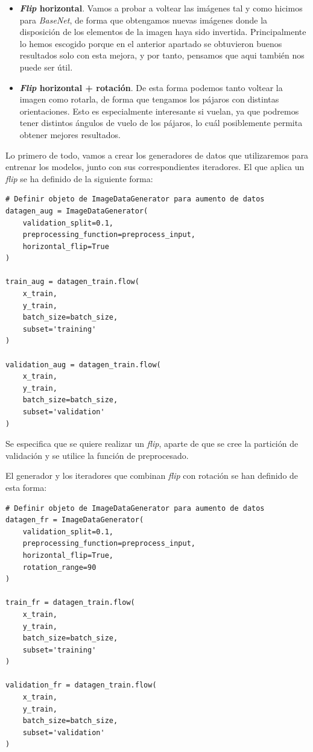 \documentclass[11pt,a4paper]{article}
\begin{document}
\begin{itemize}
  \item \textbf{\textit{Flip} horizontal}. Vamos a probar a voltear las imágenes tal y como hicimos para
  \textit{BaseNet}, de forma que obtengamos nuevas imágenes donde la disposición de los elementos de la imagen
  haya sido invertida. Principalmente lo hemos escogido porque en el anterior apartado se obtuvieron
  buenos resultados solo con esta mejora, y por tanto, pensamos que aqui también nos puede ser útil.
  \item \textbf{\textit{Flip} horizontal + rotación}. De esta forma podemos tanto voltear la imagen como
  rotarla, de forma que tengamos los pájaros con distintas orientaciones. Esto es especialmente interesante
  si vuelan, ya que podremos tener distintos ángulos de vuelo de los pájaros, lo cuál posiblemente permita
  obtener mejores resultados.
\end{itemize}

Lo primero de todo, vamos a crear los generadores de datos que utilizaremos para entrenar los modelos,
junto con sus correspondientes iteradores. El que aplica un \textit{flip} se ha definido de la siguiente
forma:

\begin{lstlisting}
# Definir objeto de ImageDataGenerator para aumento de datos
datagen_aug = ImageDataGenerator(
    validation_split=0.1,
    preprocessing_function=preprocess_input,
    horizontal_flip=True
)

train_aug = datagen_train.flow(
    x_train,
    y_train,
    batch_size=batch_size,
    subset='training'
)

validation_aug = datagen_train.flow(
    x_train,
    y_train,
    batch_size=batch_size,
    subset='validation'
)
\end{lstlisting}

Se especifica que se quiere realizar un \textit{flip}, aparte de que se cree la partición de
validación y se utilice la función de preprocesado.

El generador y los iteradores que combinan \textit{flip} con rotación se han definido de esta
forma:

\begin{lstlisting}
# Definir objeto de ImageDataGenerator para aumento de datos
datagen_fr = ImageDataGenerator(
    validation_split=0.1,
    preprocessing_function=preprocess_input,
    horizontal_flip=True,
    rotation_range=90
)

train_fr = datagen_train.flow(
    x_train,
    y_train,
    batch_size=batch_size,
    subset='training'
)

validation_fr = datagen_train.flow(
    x_train,
    y_train,
    batch_size=batch_size,
    subset='validation'
)
\end{lstlisting}
\end{document}
